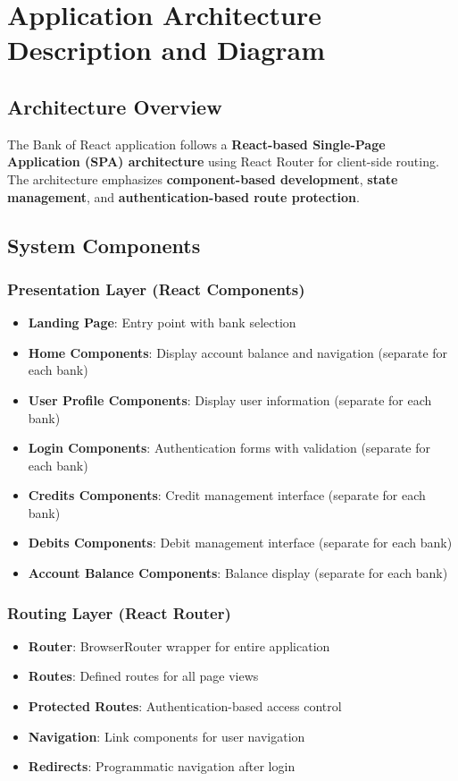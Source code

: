 \documentclass[11pt,a4paper]{article}
\begin{document}
\section{Application Architecture Description and Diagram}

\subsection{Architecture Overview}

The Bank of React application follows a \textbf{React-based Single-Page Application (SPA) architecture} using React Router for client-side routing. The architecture emphasizes \textbf{component-based development}, \textbf{state management}, and \textbf{authentication-based route protection}.

\subsection{System Components}

\subsubsection{Presentation Layer (React Components)}
\begin{itemize}[leftmargin=*]
    \item \textbf{Landing Page}: Entry point with bank selection
    \item \textbf{Home Components}: Display account balance and navigation (separate for each bank)
    \item \textbf{User Profile Components}: Display user information (separate for each bank)
    \item \textbf{Login Components}: Authentication forms with validation (separate for each bank)
    \item \textbf{Credits Components}: Credit management interface (separate for each bank)
    \item \textbf{Debits Components}: Debit management interface (separate for each bank)
    \item \textbf{Account Balance Components}: Balance display (separate for each bank)
\end{itemize}

\subsubsection{Routing Layer (React Router)}
\begin{itemize}[leftmargin=*]
    \item \textbf{Router}: BrowserRouter wrapper for entire application
    \item \textbf{Routes}: Defined routes for all page views
    \item \textbf{Protected Routes}: Authentication-based access control
    \item \textbf{Navigation}: Link components for user navigation
    \item \textbf{Redirects}: Programmatic navigation after login
\end{itemize}
\end{document}
